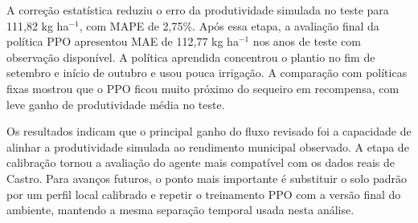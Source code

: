 A correção estatística reduziu o erro da produtividade simulada no teste para
111,82 kg ha$^{-1}$, com MAPE de 2,75\%. Após essa etapa, a avaliação final da
política PPO apresentou MAE de 112,77 kg ha$^{-1}$ nos anos de teste com
observação disponível. A política aprendida concentrou o plantio no fim de
setembro e início de outubro e usou pouca irrigação. A comparação com políticas
fixas mostrou que o PPO ficou muito próximo do sequeiro em recompensa, com leve
ganho de produtividade média no teste.

Os resultados indicam que o principal ganho do fluxo revisado foi a capacidade de
alinhar a produtividade simulada ao rendimento municipal observado. A etapa de
calibração tornou a avaliação do agente mais compatível com os dados reais de
Castro. Para avanços futuros, o ponto mais importante é substituir o solo padrão
por um perfil local calibrado e repetir o treinamento PPO com a versão final do
ambiente, mantendo a mesma separação temporal usada nesta análise.
